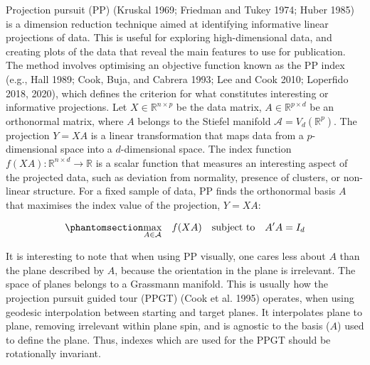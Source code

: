 \documentclass[
  12pt,
]{interact}
\theoremstyle{plain}
\begin{document}
Projection pursuit (PP) (Kruskal 1969; Friedman and Tukey 1974; Huber
1985) is a dimension reduction technique aimed at identifying
informative linear projections of data. This is useful for exploring
high-dimensional data, and creating plots of the data that reveal the
main features to use for publication. The method involves optimising an
objective function known as the PP index (e.g., Hall 1989; Cook, Buja,
and Cabrera 1993; Lee and Cook 2010; Loperfido 2018, 2020), which
defines the criterion for what constitutes interesting or informative
projections. Let \(X \in \mathbb{R}^{n\times p}\) be the data matrix,
\(A \in\mathbb{R}^{p \times d}\) be an orthonormal matrix, where \(A\)
belongs to the Stiefel manifold \(\mathcal{A} = V_d(\mathbb{R}^p)\). The
projection \(Y = XA\) is a linear transformation that maps data from a
\(p\)-dimensional space into a \(d\)-dimensional space. The index
function \(f(XA): \mathbb{R}^{n \times d} \to \mathbb{R}\) is a scalar
function that measures an interesting aspect of the projected data, such
as deviation from normality, presence of clusters, or non-linear
structure. For a fixed sample of data, PP finds the orthonormal basis
\(A\) that maximises the index value of the projection, \(Y = XA\):

\begin{equation}\phantomsection\label{eq-optimization}{
\underset{A \in \mathcal{A}}{\max } \quad f(XA) \quad \text{subject to} \quad A'A = I_d
}\end{equation}

It is interesting to note that when using PP visually, one cares less
about \(A\) than the plane described by \(A\), because the orientation
in the plane is irrelevant. The space of planes belongs to a Grassmann
manifold. This is usually how the projection pursuit guided tour (PPGT)
(Cook et al. 1995) operates, when using geodesic interpolation between
starting and target planes. It interpolates plane to plane, removing
irrelevant within plane spin, and is agnostic to the basis (\(A\)) used
to define the plane. Thus, indexes which are used for the PPGT should be
rotationally invariant.
\end{document}
